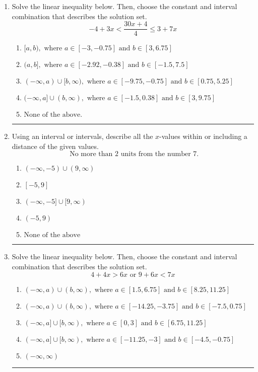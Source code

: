 \documentclass[14pt]{extbook}
\newcommand{\litem}[1]{\item#1\hspace*{-1cm}\rule{\textwidth}{0.4pt}}
\begin{document}
\begin{enumerate}
{\begin{enumerate}[label=\Alph*.]
\end{enumerate} }
\litem{
Solve the linear inequality below. Then, choose the constant and interval combination that describes the solution set.\[ -4 + 3 x < \frac{30 x + 4}{4} \leq 3 + 7 x \]\begin{enumerate}[label=\Alph*.]
\item \( [a, b), \text{ where } a \in [-3, -0.75] \text{ and } b \in [3, 6.75] \)
\item \( (a, b], \text{ where } a \in [-2.92, -0.38] \text{ and } b \in [-1.5, 7.5] \)
\item \( (-\infty, a) \cup [b, \infty), \text{ where } a \in [-9.75, -0.75] \text{ and } b \in [0.75, 5.25] \)
\item \( (-\infty, a] \cup (b, \infty), \text{ where } a \in [-1.5, 0.38] \text{ and } b \in [3, 9.75] \)
\item \( \text{None of the above.} \)

\end{enumerate} }
\litem{
Using an interval or intervals, describe all the $x$-values within or including a distance of the given values.\[ \text{ No more than } 2 \text{ units from the number } 7. \]\begin{enumerate}[label=\Alph*.]
\item \( (-\infty, -5) \cup (9, \infty) \)
\item \( [-5, 9] \)
\item \( (-\infty, -5] \cup [9, \infty) \)
\item \( (-5, 9) \)
\item \( \text{None of the above} \)

\end{enumerate} }
\litem{
Solve the linear inequality below. Then, choose the constant and interval combination that describes the solution set.\[ 4 + 4 x > 6 x \text{ or } 9 + 6 x < 7 x \]\begin{enumerate}[label=\Alph*.]
\item \( (-\infty, a) \cup (b, \infty), \text{ where } a \in [1.5, 6.75] \text{ and } b \in [8.25, 11.25] \)
\item \( (-\infty, a) \cup (b, \infty), \text{ where } a \in [-14.25, -3.75] \text{ and } b \in [-7.5, 0.75] \)
\item \( (-\infty, a] \cup [b, \infty), \text{ where } a \in [0, 3] \text{ and } b \in [6.75, 11.25] \)
\item \( (-\infty, a] \cup [b, \infty), \text{ where } a \in [-11.25, -3] \text{ and } b \in [-4.5, -0.75] \)
\item \( (-\infty, \infty) \)


\end{enumerate}}
\end{enumerate}
\end{document}
